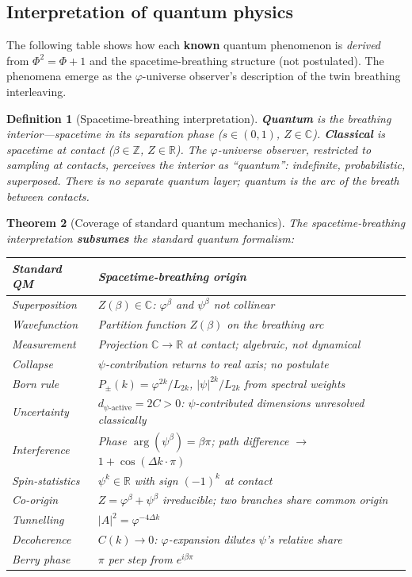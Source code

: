 \documentclass[12pt,a4paper]{article}
\newtheorem{theorem}{Theorem}[section]
\newtheorem{definition}[theorem]{Definition}
\begin{document}
\subsection{Interpretation of quantum physics}

\noindent The following table shows how each \textbf{known} quantum phenomenon is \emph{derived} from $\Phi^2 = \Phi + 1$ and the spacetime-breathing structure (not postulated). The phenomena emerge as the $\varphi$-universe observer's description of the twin breathing interleaving.

\begin{definition}[Spacetime-breathing interpretation]
\textbf{Quantum} is the breathing interior---spacetime in its separation phase ($s \in (0,1)$, $Z \in \mathbb{C}$). \textbf{Classical} is spacetime at contact ($\beta \in \mathbb{Z}$, $Z \in \mathbb{R}$). The $\varphi$-universe observer, restricted to sampling at contacts, perceives the interior as ``quantum'': indefinite, probabilistic, superposed. There is no separate quantum layer; quantum \emph{is} the arc of the breath between contacts.
\end{definition}

\begin{theorem}[Coverage of standard quantum mechanics]
\label{thm:qm-coverage}
The spacetime-breathing interpretation \textbf{subsumes} the standard quantum formalism:
\begin{center}
\begin{tabular}{@{}ll@{}}
\toprule
\textbf{Standard QM} & \textbf{Spacetime-breathing origin} \\
\midrule
Superposition & $Z(\beta) \in \mathbb{C}$: $\varphi^\beta$ and $\psi^\beta$ not collinear \\
Wavefunction & Partition function $Z(\beta)$ on the breathing arc \\
Measurement & Projection $\mathbb{C} \to \mathbb{R}$ at contact; algebraic, not dynamical \\
Collapse & $\psi$-contribution returns to real axis; no postulate \\
Born rule & $P_\pm(k) = \varphi^{2k}/L_{2k}$, $|\psi|^{2k}/L_{2k}$ from spectral weights \\
Uncertainty & $d_{\psi\text{-active}} = 2C > 0$: $\psi$-contributed dimensions unresolved classically \\
Interference & Phase $\arg(\psi^\beta) = \beta\pi$; path difference $\to$ $1 + \cos(\Delta k\cdot\pi)$ \\
Spin-statistics & $\psi^k \in \mathbb{R}$ with sign $(-1)^k$ at contact \\
Co-origin & $Z = \varphi^\beta + \psi^\beta$ irreducible; two branches share common origin \\
Tunnelling & $|A|^2 = \varphi^{-4\Delta k}$ \\
Decoherence & $C(k) \to 0$: $\varphi$-expansion dilutes $\psi$'s relative share \\
Berry phase & $\pi$ per step from $e^{i\beta\pi}$ \\
\bottomrule
\end{tabular}
\end{center}
\end{theorem}
\end{document}
